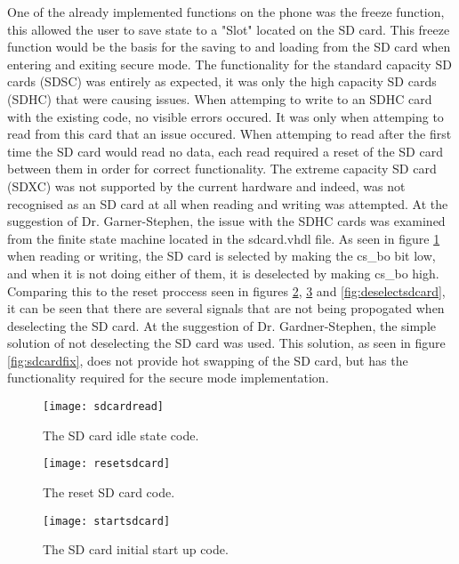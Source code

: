 One of the already implemented functions on the phone was the freeze function, this allowed the user to save state to a "Slot" located on the SD card. This freeze function would be the basis for the saving to and loading from the SD card when entering and exiting secure mode. The functionality for the standard capacity SD cards (SDSC) was entirely as expected, it was only the high capacity SD cards (SDHC) that were causing issues. When attemping to write to an SDHC card with the existing code, no visible errors occured. It was only when attemping to read from this card that an issue occured. When attemping to read after the first time the SD card would read no data, each read required a reset of the SD card between them in order for correct functionality. The extreme capacity SD card (SDXC) was not supported by the current hardware and indeed, was not recognised as an SD card at all when reading and writing was attempted. At the suggestion of Dr. Garner-Stephen, the issue with the SDHC cards was examined from the finite state machine located in the sdcard.vhdl file. As seen in figure \ref{fig:sdcardread} when reading or writing, the SD card is selected by making the cs\_bo bit low, and when it is not doing either of them, it is deselected by making cs\_bo high. Comparing this to the reset proccess seen in figures \ref{fig:resetsdcard}, \ref{fig:startsdcard} and \ref{fig:deselectsdcard}, it can be seen that there are several signals that are not being propogated when deselecting the SD card. At the suggestion of Dr. Gardner-Stephen, the simple solution of not deselecting the SD card was used. This solution, as seen in figure \ref{fig:sdcardfix}, does not provide hot swapping of the SD card, but has the functionality required for the secure mode implementation.

\begin{figure}
  \centering
  \texttt{[image: sdcardread]}
  \caption{The SD card idle state code.}
  \label{fig:sdcardread}
\end{figure}

\begin{figure}
  \centering
  \texttt{[image: resetsdcard]}
  \caption{The reset SD card code.}
  \label{fig:resetsdcard}
\end{figure}

\begin{figure}
  \centering
  \texttt{[image: startsdcard]}
  \caption{The SD card initial start up code.}
  \label{fig:startsdcard}
\end{figure}

